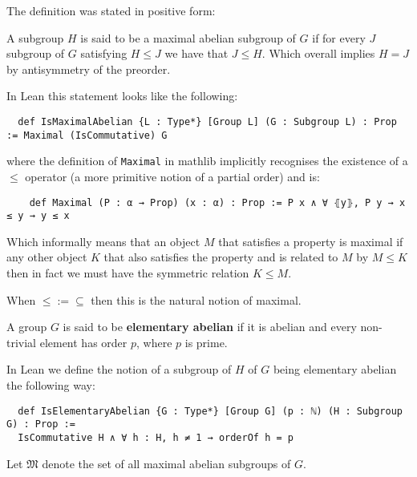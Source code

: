 \begin{remark}
The definition was stated in positive form:

A subgroup $H$ is said to be a maximal abelian subgroup of $G$ if for every $J$ subgroup of $G$ satisfying $H \le J$ we have that $J \le H$. Which overall implies $H = J$ by antisymmetry of the preorder.

In Lean this statement looks like the following:

\begin{verbatim}
  def IsMaximalAbelian {L : Type*} [Group L] (G : Subgroup L) : Prop := Maximal (IsCommutative) G
\end{verbatim}

  where the definition of \texttt{Maximal} in mathlib implicitly recognises the existence of a $\le$ operator (a more primitive notion of a partial order) and is:

  \begin{verbatim}
    def Maximal (P : α → Prop) (x : α) : Prop := P x ∧ ∀ ⦃y⦄, P y → x ≤ y → y ≤ x
  \end{verbatim}

  Which informally means that an object $M$ that satisfies a property is maximal if any other object $K$ that also satisfies the property and is related to $M$ by $M \le K$ then in fact we must have the symmetric relation $K \le M$.

  When $\le := \subseteq$ then this is the natural notion of maximal.
\end{remark}


\begin{definition}
\label{IsElementaryAbelian}
\leanok
A group $G$ is said to be \textbf{elementary abelian} if it is abelian and every non-trivial element has order $p$, where $p$ is prime.
\end{definition}

\begin{remark}
  In Lean we define the notion of a subgroup of $H$ of $G$ being elementary abelian the following way:
  
  \begin{verbatim}
  def IsElementaryAbelian {G : Type*} [Group G] (p : ℕ) (H : Subgroup G) : Prop :=
  IsCommutative H ∧ ∀ h : H, h ≠ 1 → orderOf h = p
  \end{verbatim}
\end{remark}

\begin{definition}
\label{MaximalAbelianSubgroupsOf}
\leanok
Let $\mathfrak{M}$ denote the set of all maximal abelian subgroups of $G$.
\end{definition}

